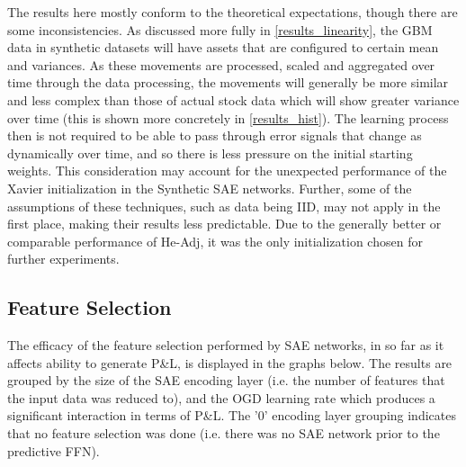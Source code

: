 \documentclass[a4paper,11pt,oneside]{article}
\theoremstyle{plain}
\theoremstyle{definition}
\begin{document}
The results here mostly conform to the theoretical expectations, though there are some inconsistencies. As discussed more fully in \ref{results_linearity}, the GBM data in synthetic datasets will have assets that are configured to certain mean and variances. As these movements are processed, scaled and aggregated over time through the data processing, the movements will generally be more similar and less complex than those of actual stock data which will show greater variance over time (this is shown more concretely in \ref{results_hist}). The learning process then is not required to be able to pass through error signals that change as dynamically over time, and so there is less pressure on the initial starting weights. This consideration may account for the unexpected performance of the Xavier initialization in the Synthetic SAE networks. Further, some of the assumptions of these techniques, such as data being IID, may not apply in the first place, making their results less predictable.  Due to the generally better or comparable performance of He-Adj, it was the only initialization chosen for further experiments.  \newline





\newpage
\subsection{Feature Selection}\label{results_reduction}

The efficacy of the feature selection performed by SAE networks, in so far as it affects ability to generate P\&L, is displayed in the graphs below. The results are grouped by the size of the SAE encoding layer (i.e. the number of features that the input data was reduced to), and the OGD learning rate which produces a significant interaction in terms of P\&L. The '0' encoding layer grouping indicates that no feature selection was done (i.e. there was no SAE network prior to the predictive FFN).
\end{document}
